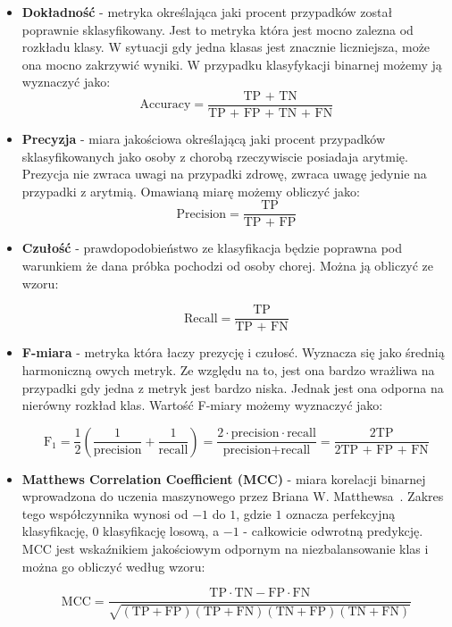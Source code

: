 \documentclass[a4paper,twoside,12pt]{book}
\begin{document}
\begin{itemize}
	\item \textbf{Dokładność} - metryka określająca jaki procent przypadków został poprawnie sklasyfikowany. Jest to metryka która jest mocno zalezna od rozkładu klasy. W sytuacji gdy jedna klasas jest znacznie liczniejsza, może ona mocno zakrzywić wyniki. W przypadku klasyfykacji binarnej możemy ją wyznaczyć jako:
	      \begin{equation}
		      \text{Accuracy} = \frac{\text{TP + TN}}{\text{TP + FP + TN + FN}}
	      \end{equation}

	\item \textbf{Precyzja} - miara jakościowa określającą jaki procent przypadków sklasyfikowanych jako osoby z chorobą rzeczywiscie posiadaja arytmię. Prezycja nie zwraca uwagi na przypadki zdrowę, zwraca uwagę jedynie na przypadki z arytmią. Omawianą miarę możemy obliczyć jako:
	      \begin{equation}
		      \text{Precision} = \frac{\text{TP}}{\text{TP + FP}}
	      \end{equation}

	\item \textbf{Czułość} - prawdopodobieństwo ze klasyfikacja będzie poprawna pod warunkiem że dana próbka pochodzi od osoby chorej. Można ją obliczyć ze wzoru:

	      \begin{equation}
		      \text{Recall} = \frac{\text{TP}}{\text{TP + FN}}
	      \end{equation}


	\item \textbf{F-miara} - metryka która łaczy prezycję i czułosć. Wyznacza się jako średnią harmoniczną owych metryk. Ze względu na to, jest ona bardzo wrażliwa na przypadki gdy jedna z metryk jest bardzo niska. Jednak jest ona odporna na nierówny rozkład klas. Wartość F-miary możemy wyznaczyć jako:

	      \begin{equation}
		      \text{F}_1 = \frac{1}{2} \left( \frac{1}{\text{precision}} + \frac{1}{\text{recall}} \right) = \frac{2 \cdot \text{precision} \cdot \text{recall}}{\text{precision} + \text{recall}} = \frac{\text{2TP}}{\text{2TP + FP + FN}}
	      \end{equation}


	\item \textbf{Matthews Correlation Coefficient (MCC)} - miara korelacji binarnej wprowadzona do uczenia maszynowego przez Briana W. Matthewsa~\cite{matthews1975}. Zakres tego współczynnika wynosi od $-1$ do $1$, gdzie $1$ oznacza perfekcyjną klasyfikację, $0$ klasyfikację losową, a $-1$ - całkowicie odwrotną predykcję. MCC jest wskaźnikiem jakościowym odpornym na niezbalansowanie klas i można go obliczyć według wzoru:

	      \begin{equation}
		      \text{MCC} = \frac{\text{TP} \cdot \text{TN} - \text{FP} \cdot \text{FN}}{\sqrt{(\text{TP} + \text{FP})(\text{TP} + \text{FN})(\text{TN} + \text{FP})(\text{TN} + \text{FN})}}
	      \end{equation}
\end{itemize}
\end{document}
